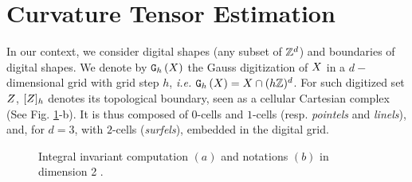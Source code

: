 \documentclass{llncs}
\begin{document}
\section{Curvature Tensor Estimation}
\label{sec:curv-tens-estim}

\sloppy In our context, we consider digital shapes (any subset of ${\mathbb{Z}}^d$) and
boundaries of digital shapes. We denote by $\mathtt{G}_{h}\left(X\right)$ the Gauss
digitization of $X$ in a $d-$dimensional grid with grid step $h$,
\emph{i.e.}  $\mathtt{G}_{h}\left(X\right) = X \cap (h{\mathbb{Z}})^d$. For such digitized set
$Z$, $\lbrack Z \rbrack_{h}$  denotes its
topological boundary, seen as a cellular Cartesian complex (See
Fig. \ref{fig:notations}-b). It is thus composed of $0$-cells and
$1$-cells (resp. \emph{pointels} and \emph{linels}), and, for $d=3$,
with $2$-cells ({\em surfels}), embedded in the digital grid.

\begin{figure}[t]{\small
    \begin{center}
      \vspace{-0.4cm}
    \end{center}}
    \caption{Integral invariant computation $(a)$ and
      notations $(b)$ in dimension 2 \cite{CVIU2014}.\label{fig:notations}}
\end{figure}

\end{document}
